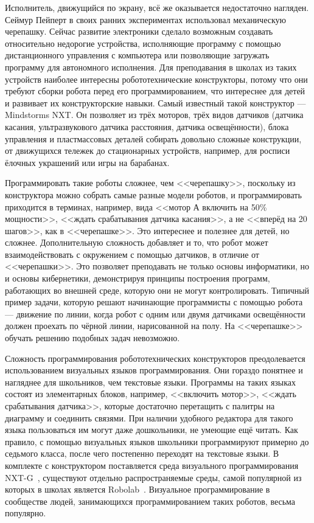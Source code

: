 Исполнитель, движущийся по экрану, всё же оказывается недостаточно нагляден. Сеймур Пейперт 
в своих ранних экспериментах использовал механическую черепашку. Сейчас развитие электроники 
сделало возможным создавать относительно недорогие устройства, исполняющие программу 
с помощью дистанционного управления с компьютера или позволяющие загружать программу 
для автономного исполнения. Для преподавания в школах из таких устройств наиболее 
интересны робототехнические конструкторы, потому что они требуют сборки робота перед 
его программированием, что интереснее для детей и развивает их конструкторские навыки. 
Самый известный такой конструктор --- Mindstorms NXT. Он позволяет из трёх моторов, 
трёх видов датчиков (датчика касания, ультразвукового датчика расстояния, датчика 
освещённости), блока управления и пластмассовых деталей собирать довольно сложные 
конструкции, от движущихся тележек до стационарных устройств, например, для росписи 
ёлочных украшений или игры на барабанах. 

Программировать такие роботы сложнее, чем <<черепашку>>, поскольку из конструктора 
можно собрать самые разные модели роботов, и программировать приходится в терминах, 
например, вида <<мотор А включить на 50\% мощности>>, <<ждать срабатывания датчика касания>>, 
а не <<вперёд на 20 шагов>>, как в <<черепашке>>. Это интереснее и полезнее для детей, 
но сложнее. Дополнительную сложность добавляет и то, что робот может взаимодействовать 
с окружением с помощью датчиков, в отличие от <<черепашки>>. Это позволяет преподавать 
не только основы информатики, но и основы кибернетики, демонстрируя принципы построения 
программ, работающих во внешней среде, которую они не могут контролировать. Типичный 
пример задачи, которую решают начинающие программисты с помощью робота --- движение по линии, 
когда робот с одним или двумя датчиками освещённости должен проехать по чёрной линии, 
нарисованной на полу. На <<черепашке>> обучать решению подобных задач невозможно.

Сложность программирования робототехнических конструкторов преодолевается использованием 
визуальных языков программирования. Они гораздо понятнее и нагляднее для школьников, 
чем текстовые языки. Программы на таких языках состоят из элементарных блоков, например, 
<<включить мотор>>, <<ждать срабатывания датчика>>, которые достаточно перетащить с 
палитры на диаграмму и соединить связями. При наличии удобного редактора для такого 
языка пользоваться им могут даже дошкольники, не умеющие ещё читать. Как правило, с 
помощью визуальных языков школьники программируют примерно до седьмого класса, после 
чего постепенно переходят на текстовые языки. В комплекте с конструктором поставляется среда визуального программирования 
NXT-G~\cite{nxtG}, существуют отдельно распространяемые среды, самой популярной из которых в школах является Robolab~\cite{portsmore1999robolab}. 
Визуальное программирование в сообществе людей, занимающихся программированием таких роботов, весьма популярно.

